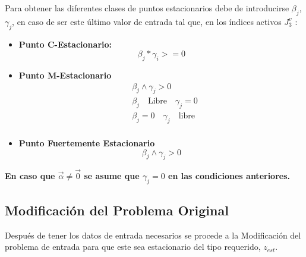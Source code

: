 Para obtener las diferentes clases de puntos estacionarios debe de introducirse $\beta_j$, $\gamma_j$, en caso de ser este último valor de entrada tal que, en los índices activos $J_3^v$ : 
\begin{itemize}
    \item \textbf{Punto C-Estacionario:}\\
    \begin{equation}
        \beta_j * \gamma_i >=0
        \label{Requisitos puntos C-Estacionario}
    \end{equation}
    \item \textbf{Punto M-Estacionario}\\
    \begin{equation}
        \begin{aligned}
            &\beta_j \land \gamma_j>0\\
            &\beta_j \quad \text{Libre} \quad \gamma_j=0\\
            &\beta_j=0 \quad \gamma_j \quad \text{libre}\\
        \end{aligned}
        \label{Requisitos puntos M-Estacionarios}
    \end{equation}
    \item \textbf{Punto Fuertemente Estacionario}\\
     \begin{equation}
        \beta_j \land \gamma_j >0
    \label{Requisitos puntos Fuertemente Estacionarios}
    \end{equation}    
\end{itemize}
\textbf{En caso que $\vec{\alpha} \neq \vec{0}$ se asume que $\gamma_j=0$ en las condiciones anteriores.}


\subsection{Modificación del Problema Original}
Después de tener los datos de entrada necesarios se procede a la Modificación
del problema de entrada para que este sea estacionario del tipo requerido, $z_{est}$.

